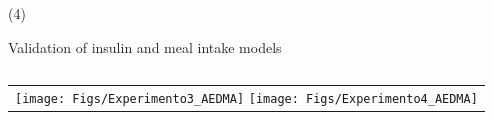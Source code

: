\begin{frame}{ (4)}
\begin{block}{Validation of insulin and meal intake models }
\begin{columns}
\begin{column}{0.40\textwidth}
\begin{center}
\begin{tabular}{c}
\texttt{[image: Figs/Experimento3\_AEDMA]}     
\texttt{[image: Figs/Experimento4\_AEDMA]}     \\        
          \end{tabular}
     \end{center}
\end{column}
\end{columns}
\end{block} 
\end{frame}





